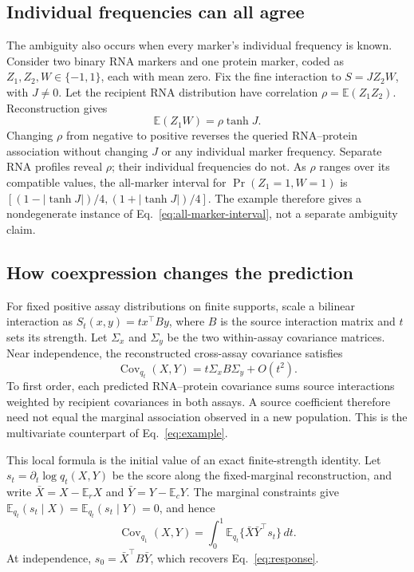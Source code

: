 \documentclass[pdflatex,sn-vancouver-num,iicol]{sn-jnl}
\begin{document}
\subsection{Individual frequencies can all agree}
The ambiguity also occurs when every marker's individual frequency is known.
Consider two binary RNA markers and one protein marker, coded as
$Z_1,Z_2,W\in\{-1,1\}$, each with mean zero. Fix the fine interaction to
$S=JZ_2W$, with $J\ne0$. Let the recipient RNA distribution have correlation
$\rho=\mathbb E(Z_1Z_2)$. Reconstruction gives
\begin{equation}
 \mathbb E(Z_1W)=\rho\tanh J.
 \label{eq:example}
\end{equation}
Changing $\rho$ from negative to positive reverses the queried RNA--protein
association without changing $J$ or any individual marker frequency. Separate
RNA profiles reveal $\rho$; their individual frequencies do not. As $\rho$
ranges over its compatible values, the all-marker interval for
$\Pr(Z_1=1,W=1)$ is
$[(1-|\tanh J|)/4,(1+|\tanh J|)/4]$. The example therefore gives a nondegenerate
instance of Eq.~\eqref{eq:all-marker-interval}, not a separate ambiguity claim.

\ifdefined\ReaderVersion{}\fi
\subsection{How coexpression changes the prediction}
For fixed positive assay distributions on finite supports, scale a bilinear
interaction as $S_t(x,y)=t x^\top B y$, where $B$ is the source interaction
matrix and $t$ sets its strength. Let $\Sigma_x$ and $\Sigma_y$ be the two
within-assay covariance matrices. Near independence, the reconstructed
cross-assay covariance satisfies
\begin{equation}
 \operatorname{Cov}_{q_t}(X,Y)=t\Sigma_x B\Sigma_y+O(t^2).
 \label{eq:response}
\end{equation}
To first order, each predicted RNA--protein covariance sums source
interactions weighted by recipient covariances in both assays. A source
coefficient therefore need not equal the marginal association observed in a
new population. This is the multivariate counterpart of
Eq.~\eqref{eq:example}.

This local formula is the initial value of an exact finite-strength identity.
Let $s_t=\partial_t\log q_t(X,Y)$ be the score along the fixed-marginal
reconstruction, and write $\bar X=X-\mathbb E_rX$ and
$\bar Y=Y-\mathbb E_cY$. The marginal constraints give
$\mathbb E_{q_t}(s_t\mid X)=\mathbb E_{q_t}(s_t\mid Y)=0$, and hence
\begin{equation}
 \operatorname{Cov}_{q_1}(X,Y)
 =\int_0^1\mathbb E_{q_t}\{\bar X\bar Y^\top s_t\}\,dt.
 \label{eq:response-integral}
\end{equation}
At independence, $s_0=\bar X^\top B\bar Y$, which recovers
Eq.~\eqref{eq:response}.
\end{document}
